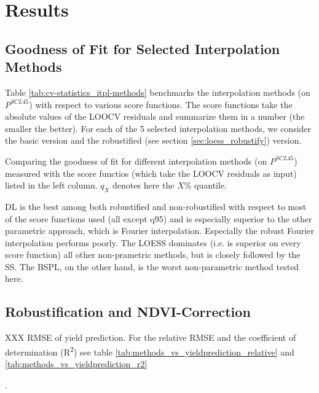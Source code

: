 \chapter{Results}

\section{Goodness of Fit for Selected Interpolation Methods}{
	\label{sec:results_itpl}
	Table \ref{tab:cv-statistics_itpl-methods} benchmarks the interpolation methods (on $P^{SCL45}$) with respect to various score functions. The score functions take the absolute values of the LOOCV residuals and summarize them in a number (the smaller the better). For each of the 5 selected interpolation methods, we consider the basic version and the robustified (see section \ref{sec:loess_robustify}) version.

	\begin{table}[h]
		\begin{center}
			\caption{Comparing the goodness of fit for different interpolation methods (on $P^{SCL45}$) measured with the score functios (which take the LOOCV residuals as input) listed in the left column. $q_X$ denotes here the $X\%$ quantile.}
			\scriptsize
			
			\normalsize
			\label{tab:cv-statistics_itpl-methods}
		\end{center}
	\end{table}
	
	DL is the best among both robustified and non-robustified with respect to most of the score functions used (all except q95) and is especially superior to the other parametric approach, which is Fourier interpolation. Especially the robust Fourier interpolation performs poorly. The LOESS dominates (i.e. is superior on every score function) all other non-prametric methods, but is closely followed by the SS. The BSPL, on the other hand, is the worst non-parametric method tested here. 
}


\section{Robustification and NDVI-Correction} \label{sec:results_ndvi_corr}
\begin{table}
	\begin{center}
		\caption{XXX RMSE of yield prediction. For the relative RMSE and the coefficient of determination (R\textsuperscript{2}) see table \ref{tab:methods_vs_yieldprediction_relative} and \ref{tab:methods_vs_yieldprediction_r2}}.
		\small
		
		\label{tab:methods_vs_yieldprediction}
		\normalsize
	\end{center}
\end{table}





